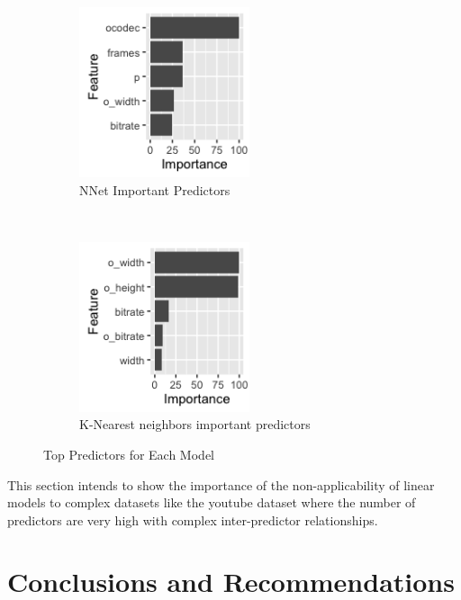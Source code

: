\documentclass[letterpaper,12pt,titlepage,oneside,final]{report}
\begin{document}
            \begin{figure}[!ht]
            \begin{subfigure}[t]{0.5\textwidth}
                \centering
                \includegraphics[height=5cm]{nnetvarimp}
                \caption{NNet Important Predictors}
                \label{nnetvarimp}
            \end{subfigure}%
                ~ 
            \begin{subfigure}[t]{0.5\textwidth}
                \centering
                \includegraphics[height=5cm]{knnvarimp}
                \caption{K-Nearest neighbors important predictors}
                \label{knnvarimp}
            \end{subfigure}
            \caption{Top Predictors for Each Model}
            \end{figure}
            This section intends to show the importance of the non-applicability of linear models to complex datasets like the youtube dataset where the number of predictors are very high with complex inter-predictor relationships.

\chapter{Conclusions and Recommendations}
\end{document}
